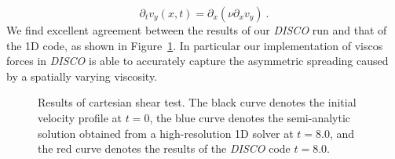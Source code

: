 \documentclass[apj]{emulateapj}
\begin{document}
          \begin{equation}
          \partial_t v_y(x,t) = \partial_x \left( \nu \partial_x v_y \right)\ .
          \end{equation}
          We find excellent agreement between the results of our {\it DISCO} run and that of the 1D code, as shown in Figure~\ref{fig:shear}. In particular our implementation of viscos forces in {\it DISCO} is able to accurately capture the asymmetric spreading caused by a spatially varying viscosity.
          \begin{figure}
          \caption{Results of cartesian shear test. The black curve denotes the initial velocity profile at $t=0 $, the blue curve denotes the semi-analytic solution obtained from a high-resolution 1D solver at $t=8.0$, and the red curve denotes the results of the {\it DISCO} code $t=8.0$. }
          \label{fig:shear}
          \end{figure}
\end{document}
